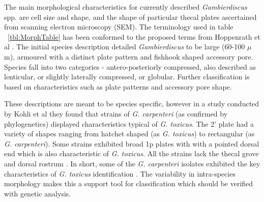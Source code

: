 \documentclass[12pt]{article}
\begin{document}
The main morphological characteristics for currently described \emph{Gambierdiscus} spp. are cell size and shape, and the shape of particular thecal plates ascertained from scanning electron microscopy (SEM). The terminology used in table ~\ref{tbl:MorphTable} has been conformed to the proposed terms from Hoppenrath et al \cite{hoppenrath2013taxonomy}. The initial species description detailed \emph{Gambierdiscus} to be large (60-100 $\mu$m), armoured with a distinct plate pattern and fishhook shaped accessory pore. Species fall into two categories - antero-posteriorly compressed, also described as lenticular, or slightly laterally compressed, or globular. Further classification is based on characteristics such as plate patterns and accessory pore shape. %

These descriptions are meant to be species specific, however in a study conducted by Kohli et al they found that strains of \emph{G. carpenteri} (as confirmed by phylogenetics) displayed characteristics typical of \emph{G. toxicus}. The 2' plate had a variety of shapes ranging from hatchet shaped (as \emph{G. toxicus}) to rectangular (as \emph{G. carpenteri}). Some strains exhibited broad 1p plates with with a pointed dorsal end which is also characteristic of \emph{G. toxicus}. All the strains lack the thecal grove and  dorsal rostrum \cite{litaker2009taxonomy}. In short, some of the \emph{G. carpenteri} isolates exhibited the key characteristics of \emph{G. toxicus} identification \cite{kohli2014high}.
The variability in intra-species morphology makes this a support tool for classification which should be verified with genetic analysis. \\
\end{document}
